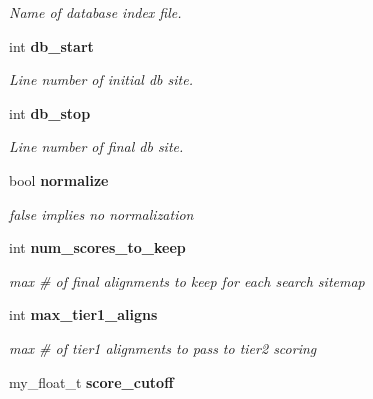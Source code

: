 \begin{CompactItemize}
\begin{CompactList}\small\item\em Name of database index file. \item\end{CompactList}\item 
int \bf{db\_\-start}\label{classSimSite3D_1_1SearchParameters_2cd53037b00008f5039381a00085f93d}

\begin{CompactList}\small\item\em Line number of initial db site. \item\end{CompactList}\item 
int \bf{db\_\-stop}\label{classSimSite3D_1_1SearchParameters_b12f931a64c6d18141bb94cb283c1543}

\begin{CompactList}\small\item\em Line number of final db site. \item\end{CompactList}\item 
bool \bf{normalize}\label{classSimSite3D_1_1SearchParameters_4265eb5c3b8cd524159bcefd855458fa}

\begin{CompactList}\small\item\em false implies no normalization \item\end{CompactList}\item 
int \bf{num\_\-scores\_\-to\_\-keep}\label{classSimSite3D_1_1SearchParameters_275f0141e87e686c4c8ee55d9062ae81}

\begin{CompactList}\small\item\em max \# of final alignments to keep for each search sitemap \item\end{CompactList}\item 
int \bf{max\_\-tier1\_\-aligns}\label{classSimSite3D_1_1SearchParameters_d8fa144982e1f3a459b6797170fec1e9}

\begin{CompactList}\small\item\em max \# of tier1 alignments to pass to tier2 scoring \item\end{CompactList}\item 
my\_\-float\_\-t \bf{score\_\-cutoff}\label{classSimSite3D_1_1SearchParameters_2ee1752f506f23f99dc8639465c83015}


\end{CompactItemize}

